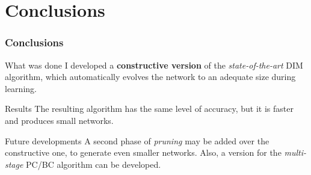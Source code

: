 \documentclass{beamer}
\begin{document}
			
	\section{Conclusions}
		\begin{frame}
			\frametitle{Conclusions}
			\begin{block}{What was done}
				I developed a \textbf{constructive version} of the \emph{state-of-the-art} DIM algorithm, which automatically evolves the network to an adequate size during learning.
			\end{block}
			\begin{block}{Results}
				The resulting algorithm has the same level of accuracy, but it is faster and produces small networks.
			\end{block}
			\begin{exampleblock}{Future developments}
				A second phase of \emph{pruning} may be added over the constructive one, to generate even smaller networks. Also, a version for the \emph{multi-stage} PC/BC algorithm can be developed.
			\end{exampleblock}
		\end{frame}
\end{document}

